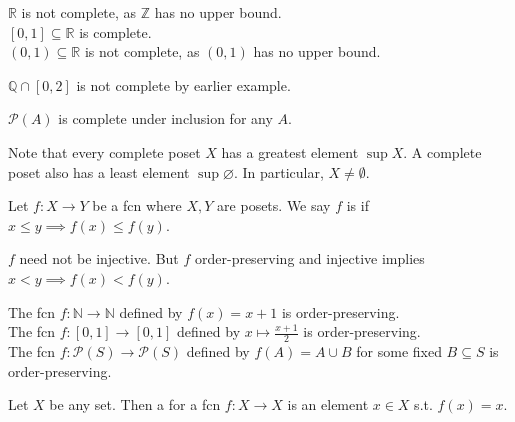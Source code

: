 \begin{example}
    $\mathbb R$ is not complete, as $\mathbb Z$ has no upper bound. \\
    $[0,1] \subseteq \mathbb R$ is complete. \\
    $(0,1) \subseteq \mathbb R$ is not complete, as $(0,1)$ has no upper bound.
\end{example}

\begin{example}
    $\mathbb{Q} \cap [0, 2]$ is not complete by earlier example.
\end{example}

\begin{example}
    $\mathcal P(A)$ is complete under inclusion for any $A$.
\end{example}

\begin{remark}
    Note that every complete poset $X$ has a greatest element $\sup X$.
    A complete poset also has a least element $\sup \varnothing$.
    In particular, $X \neq \emptyset$.
\end{remark}

\begin{definition}
    Let $f \colon X \to Y$ be a fcn where $X, Y$ are posets.
    We say $f$ is  if $x \leq y \implies f(x) \leq f(y)$.
\end{definition}

\begin{note}
    $f$ need not be injective.
    But $f$ order-preserving and injective implies $x < y \implies f(x) < f(y)$.
\end{note}

\begin{example}
    The fcn $f \colon \mathbb N \to \mathbb N$ defined by $f(x) = x + 1$ is order-preserving. \\
    The fcn $f \colon [0,1] \to [0,1]$ defined by $x \mapsto \frac{x+1}{2}$ is order-preserving. \\
    The fcn $f \colon \mathcal P(S) \to \mathcal P(S)$ defined by $f(A) = A \cup B$ for some fixed $B \subseteq S$ is order-preserving.
\end{example}

\begin{definition}
    Let $X$ be any set.
    Then a  for a fcn $f : X \to X$ is an element $x \in X$ s.t. $f(x) = x$.
\end{definition}

